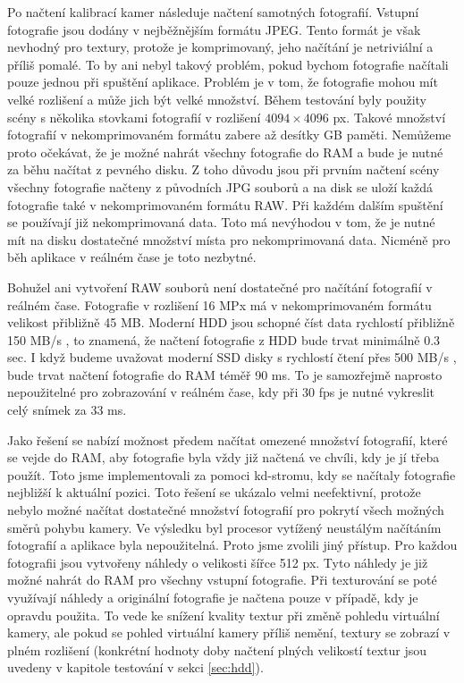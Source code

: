 \documentclass[11pt,twoside,a4paper]{book}
\begin{document}
 Po načtení kalibrací kamer následuje načtení samotných fotografií. Vstupní fotografie jsou dodány v nejběžnějším formátu JPEG. Tento formát je však nevhodný pro textury, protože je komprimovaný, jeho načítání je netriviální a příliš pomalé. To by ani nebyl takový problém, pokud bychom fotografie načítali pouze jednou při spuštění aplikace. Problém je v tom, že fotografie mohou mít velké rozlišení a může jich být velké množství. Během testování byly použity scény s několika stovkami fotografií v rozlišení $4094\times4096$ px. Takové množství fotografií v nekomprimovaném formátu zabere až desítky GB paměti. Nemůžeme proto očekávat, že je možné nahrát všechny fotografie do RAM a bude je nutné za běhu načítat z pevného disku. Z toho důvodu jsou při prvním načtení scény všechny fotografie načteny z původních JPG souborů a na disk se uloží každá fotografie také v nekomprimovaném formátu RAW. Při každém dalším spuštění se používají již nekomprimovaná data. Toto má nevýhodou v tom, že je nutné mít na disku dostatečné množství místa pro nekomprimovaná data. Nicméně pro běh aplikace v reálném čase je toto nezbytné.

Bohužel ani vytvoření RAW souborů není dostatečné pro načítání fotografií v reálném čase. Fotografie v rozlišení 16 MPx má v nekomprimovaném formátu velikost přibližně 45 MB. Moderní HDD jsou schopné číst data rychlostí přibližně 150 MB/s \cite{hdd}, to znamená, že načtení fotografie z HDD bude trvat minimálně 0.3 sec. I když budeme uvažovat moderní SSD disky s rychlostí čtení přes 500 MB/s \cite{ssd}, bude trvat načtení fotografie do RAM téměř 90 ms. To je samozřejmě naprosto nepoužitelné pro zobrazování v reálném čase, kdy při 30 fps je nutné vykreslit celý snímek za 33 ms.

Jako řešení se nabízí možnost předem načítat omezené množství fotografií, které se vejde do RAM, aby fotografie byla vždy již načtená ve chvíli, kdy je jí třeba použít. Toto jsme implementovali za pomoci kd-stromu, kdy se načítaly fotografie nejbližší k aktuální pozici. Toto řešení se ukázalo velmi neefektivní, protože nebylo možné načítat dostatečné množství fotografií pro pokrytí všech možných směrů pohybu kamery. Ve výsledku byl procesor vytížený neustálým načítáním fotografií a aplikace byla nepoužitelná. Proto jsme zvolili jiný přístup. Pro každou fotografii jsou vytvořeny náhledy o velikosti šířce 512 px. Tyto náhledy je již možné nahrát do RAM pro všechny vstupní fotografie. Při texturování se poté využívají náhledy a originální fotografie je načtena pouze v případě, kdy je opravdu použita. To vede ke snížení kvality textur při změně pohledu virtuální kamery, ale pokud se pohled virtuální kamery příliš nemění, textury se zobrazí v plném rozlišení (konkrétní hodnoty doby načtení plných velikostí textur  jsou uvedeny v kapitole testování v sekci \ref{sec:hdd}).
\end{document}
